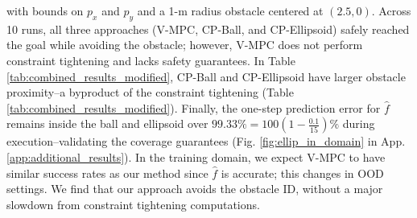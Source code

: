 \documentclass{l4dc2026}
\begin{document}
\noindent with bounds on $p_x$ and $p_y$ and a 1-m radius obstacle centered at $(2.5, 0)$. Across 10 runs, all three approaches (V-MPC, CP-Ball, and CP-Ellipsoid) safely reached the goal while avoiding the obstacle; however, V-MPC does not perform constraint tightening and lacks safety guarantees. In Table \ref{tab:combined_results_modified}, CP-Ball and CP-Ellipsoid have larger obstacle proximity--a byproduct of the constraint tightening (Table \ref{tab:combined_results_modified}).
Finally, the one-step prediction error for $\hat f$ remains inside the ball and ellipsoid over $99.33\% = 100(1-\frac{0.1}{15})\%$ during execution--validating the coverage guarantees (Fig. \ref{fig:ellip_in_domain} in App. \ref{app:additional_results}).
In the training domain, we expect V-MPC to have similar success rates as our method since $\hat f$ is accurate; this changes in OOD settings. We find that our approach avoids the obstacle ID, without a major slowdown from constraint tightening computations.

\vspace{-5pt}
\end{document}
